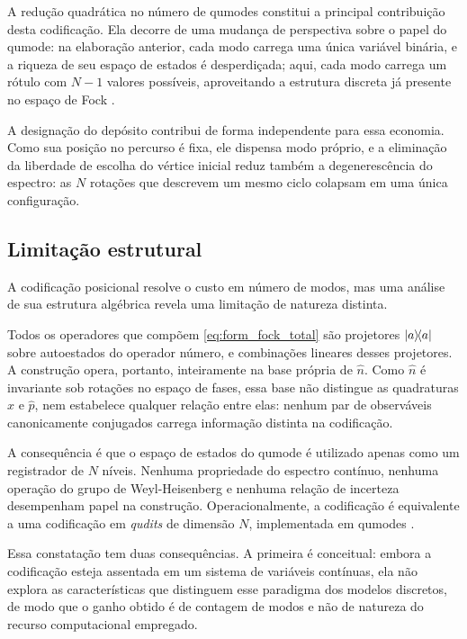         A redução quadrática no número de qumodes constitui a principal contribuição desta codificação. Ela decorre de uma mudança de perspectiva sobre o papel do qumode: na elaboração anterior, cada modo carrega uma única variável binária, e a riqueza de seu espaço de estados é desperdiçada; aqui, cada modo carrega um rótulo com $N-1$ valores possíveis, aproveitando a estrutura discreta já presente no espaço de Fock \cite{?}.

        A designação do depósito contribui de forma independente para essa economia. Como sua posição no percurso é fixa, ele dispensa modo próprio, e a eliminação da liberdade de escolha do vértice inicial reduz também a degenerescência do espectro: as $N$ rotações que descrevem um mesmo ciclo colapsam em uma única configuração.

    \subsection{Limitação estrutural}\label{subsec:form_fock_limitacao}

        A codificação posicional resolve o custo em número de modos, mas uma análise de sua estrutura algébrica revela uma limitação de natureza distinta.

        Todos os operadores que compõem \autoref{eq:form_fock_total} são projetores $\ketbra{a}{a}$ sobre autoestados do operador número, e combinações lineares desses projetores. A construção opera, portanto, inteiramente na base própria de $\hat{n}$. Como $\hat{n}$ é invariante sob rotações no espaço de fases, essa base não distingue as quadraturas $\hat{x}$ e $\hat{p}$, nem estabelece qualquer relação entre elas: nenhum par de observáveis canonicamente conjugados carrega informação distinta na codificação.

        A consequência é que o espaço de estados do qumode é utilizado apenas como um registrador de $N$ níveis. Nenhuma propriedade do espectro contínuo, nenhuma operação do grupo de Weyl-Heisenberg e nenhuma relação de incerteza desempenham papel na construção. Operacionalmente, a codificação é equivalente a uma codificação em \textit{qudits} de dimensão $N$, implementada em qumodes \cite{?}.

        Essa constatação tem duas consequências. A primeira é conceitual: embora a codificação esteja assentada em um sistema de variáveis contínuas, ela não explora as características que distinguem esse paradigma dos modelos discretos, de modo que o ganho obtido é de contagem de modos e não de natureza do recurso computacional empregado.


